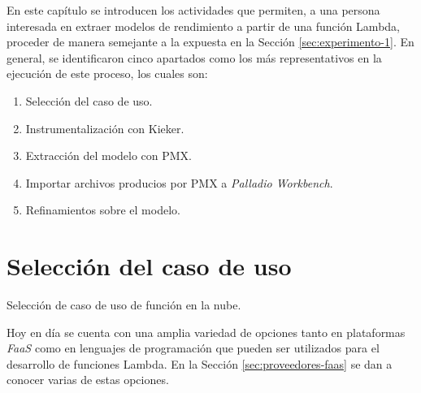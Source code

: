 En este capítulo se introducen los actividades que permiten, a una persona interesada en extraer modelos de rendimiento a partir de una función Lambda, proceder de manera semejante a la expuesta en la Sección \ref{sec:experimento-1}. En general, se identificaron cinco apartados como los más representativos en la ejecución de este proceso, los cuales son:
\begin{enumerate}
    \item Selección del caso de uso.
    \item Instrumentalización con Kieker.
    \item Extracción del modelo con PMX.
    \item Importar archivos producios por PMX a \emph{Palladio Workbench}.
    \item Refinamientos sobre el modelo.
\end{enumerate}

\section{Selección del caso de uso}

\begin{singlespace}
\begin{algorithm}[H]
\SetAlgoLined

\caption{Selección de caso de uso de función en la nube.}
\end{algorithm}
\end{singlespace}

Hoy en día se cuenta con una amplia variedad de opciones tanto en plataformas \emph{FaaS} como en lenguajes de programación que pueden ser utilizados para el desarrollo de funciones Lambda. En la Sección \ref{sec:proveedores-faas} se dan a conocer varias de estas opciones.

